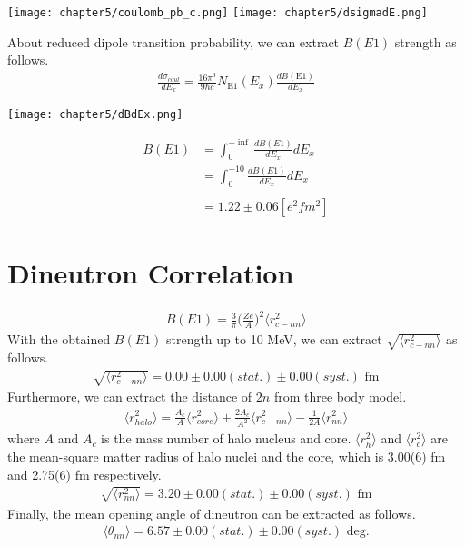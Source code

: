 \begin{center}
    \texttt{[image: chapter5/coulomb\_pb\_c.png]}    
    \texttt{[image: chapter5/dsigmadE.png]}    
\end{center}    

About reduced dipole transition probability, we can extract $B(E1)$ strength as follows.
\begin{align}
    \frac{d \sigma_{coul}}{dE_x} = \frac{16 \pi^{3} }{9 \hbar c} N_{\text{E1}}(E_x) \frac{dB(\text{E1})}{dE_x}
\end{align}

\begin{center}
    \texttt{[image: chapter5/dBdEx.png]}    
\end{center}  
\begin{align}
    B(E1) &= \int_{0}^{+\inf} \frac{dB(E1)}{dE_x} dE_x \\
          &= \int_{0}^{+10} \frac{dB(E1)}{dE_x} dE_x \\
          \\ 
          &= 1.22 \pm 0.06  [e^{2}fm^{2}]    
\end{align}  

\section{Dineutron Correlation}

\begin{align}
    B(E1) = \frac{3}{\pi} \bigg( \frac{Ze}{A} \bigg)^2 \langle r^{2}_{c-nn} \rangle
\end{align}
With the obtained $B(E1)$ strength up to 10 MeV, we can extract $\sqrt{ \langle r^{2}_{c-nn} \rangle}$ as follows.
\begin{align}
    \sqrt{ \langle r^{2}_{c-nn} \rangle} = 0.00 \pm 0.00 (stat.) \pm 0.00 (syst.) \text{ fm}
\end{align}
Furthermore, we can extract the distance of $2n$ from three body model.
\begin{align}
    \langle r^{2}_{halo} \rangle = \frac{A_c}{A} \langle r^{2}_{core} \rangle + \frac{2A_c}{A^2} \langle r^{2}_{c-nn} \rangle - \frac{1}{2A} \langle r^{2}_{nn} \rangle
\end{align}
where $A$ and $A_c$ is the mass number of halo nucleus and core. $\langle r^{2}_{h} \rangle$ and $\langle r^{2}_{c} \rangle$ are the mean-square matter radius of halo nuclei and the core, which is 3.00(6) fm and 2.75(6) fm respectively.
\begin{align}
    \sqrt{ \langle r^{2}_{nn} \rangle} = 3.20 \pm 0.00 (stat.) \pm 0.00 (syst.) \text{ fm}
\end{align}
Finally, the mean opening angle of dineutron can be extracted as follows.
\begin{align}
    \langle \theta_{nn} \rangle = 6.57 \pm 0.00 (stat.) \pm 0.00 (syst.) \text{ deg.}
\end{align}